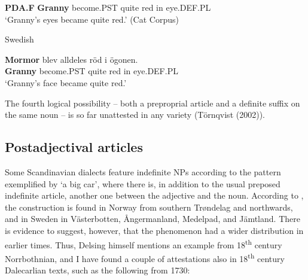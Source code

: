 \textbf{PDA.F} \textbf{Granny} become.PST  quite  red  in  eye.DEF.PL\\

\glt ‘Granny’s eyes became quite red.’ (Cat Corpus)

\z

\item 

Swedish



 \ea\label{}
\gll \textbf{Mormor} blev  alldeles  röd  i  ögonen.\\


\textbf{Granny} become.PST  quite  red  in  eye.DEF.PL\\

\glt ‘Granny’s face became quite red.’ 

\z

The fourth logical possibility – both a preproprial article and a definite suffix on the same noun – is so far unattested in any variety (Törnqvist (2002)). 


\subsection{\rmfamily Postadjectival articles}

Some Scandinavian dialects feature indefinite NPs according to the pattern exemplified by ‘a big car’, where there is, in addition to the usual preposed indefinite article, another one between the adjective and the noun. According to \citet[46]{Delsing2003a}, the construction is found in Norway from southern Trøndelag and northwards, and in Sweden in Västerbotten, Ångermanland, Medelpad, and Jämtland. There is evidence to suggest, however, that the phenomenon had a wider distribution in earlier times. Thus, Delsing himself mentions an example from 18\textsuperscript{th} century Norrbothnian, and I have found a couple of attestations also in 18\textsuperscript{th} century Dalecarlian texts, such as the following from 1730: 

